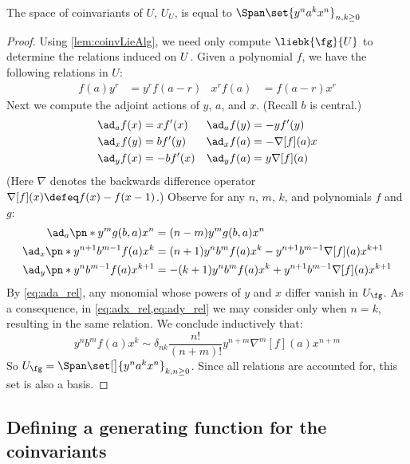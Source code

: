 \documentclass{article}
\begin{document}
\begin{theorem}
        The space of coinvariants of $U$, $U_U$, is equal to
        $\Span\set{y^n a^k x^n}_{n, k\ge 0}$
\end{theorem}
\begin{proof}
Using \cref{lem:coinvLieAlg}, we need only compute $\liebk{\Alg}{\CU}$ to
determine the relations induced on $U$. Given a polynomial $f$, we have the
following relations in $U$:
\begin{align}
        f(a)y^r &= y^rf(a-r) &
        x^rf(a) &= f(a-r)x^r
\end{align}
Next we compute the adjoint actions of $y$, $a$, and $x$. (Recall $b$ is
central.)
\begin{align}
  \ad_a f(x) &= xf'(x)&
  \ad_a f(y) &= -yf'(y)\label{eq:ada}\\
  \ad_x f(y) &= bf'(y) &
  \ad_x f(a) &= -\nabla[f](a)x\label{eq:adx}\\
  \ad_y f(x) &= -bf'(x) &
  \ad_y f(a) &= y\nabla[f](a)\label{eq:ady}
\end{align}
(Here $\nabla$ denotes the backwards difference operator $\nabla[f](x) \defeq
f(x) - f(x-1)$.) Observe for any $n$, $m$, $k$, and polynomials $f$ and $g$:
\begin{align}
        \ad_a \pn*{y^m g(b, a) x^n } &= (n-m)y^mg(b, a) x^n
        \label{eq:ada_rel}\\
        \ad_{x}\pn*{y^{n+1}b^{m-1}f(a)x^{k}} &=
                (n+1)y^{n}b^{m}f(a)x^{k} - y^{n+1}b^{m-1}\nabla[f](a)x^{k+1}
        \label{eq:adx_rel}\\
        \ad_{y}\pn*{y^n b^{m-1} f(a) x^{k+1}} &=
                - (k+1)y^n b^m f(a) x^k + y^{n+1} b^{m-1} \nabla[f](a)x^{k+1}
        \label{eq:ady_rel}
\end{align}
By \cref{eq:ada_rel}, any monomial whose powers of $y$ and $x$ differ vanish in
$\CU_{\Alg}$. As a consequence, in \cref{eq:adx_rel,eq:ady_rel} we may consider
only when $n=k$, resulting in the same relation. We conclude inductively that:
\begin{equation}
        y^n b^m f(a) x^k \sim δ_{nk}\frac{n!}{(n+m)!}y^{n+m}\nabla^m[f](a)x^{n+m}
\end{equation}
So $\CU_{\Alg} = \Span\set[\big]{y^n a^k x^n}_{k, n \ge 0}$. Since all relations
are accounted for, this set is also a basis.
\end{proof}

\subsection{Defining a generating function for the coinvariants}
\end{document}
